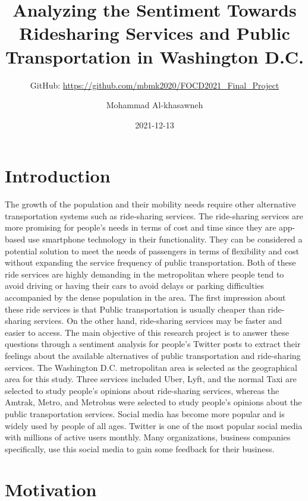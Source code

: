 \documentclass[
  12pt,
]{article}
\title{Analyzing the Sentiment Towards Ridesharing Services and Public
Transportation in Washington D.C.}
\subtitle{GitHub: \url{https://github.com/mbmk2020/FOCD2021_Final_Project}}
\author{Mohammad Al-khasawneh}
\date{2021-12-13}
\begin{document}
\maketitle

{
\hypersetup{linkcolor=}
\setcounter{tocdepth}{2}
\tableofcontents
}
\newpage

\hypertarget{introduction}{%
\section{Introduction}\label{introduction}}

The growth of the population and their mobility needs require other
alternative transportation systems such as ride-sharing services. The
ride-sharing services are more promising for people's needs in terms of
cost and time since they are app-based use smartphone technology in
their functionality. They can be considered a potential solution to meet
the needs of passengers in terms of flexibility and cost without
expanding the service frequency of public transportation. Both of these
ride services are highly demanding in the metropolitan where people tend
to avoid driving or having their cars to avoid delays or parking
difficulties accompanied by the dense population in the area. The first
impression about these ride services is that Public transportation is
usually cheaper than ride-sharing services. On the other hand,
ride-sharing services may be faster and easier to access. The main
objective of this research project is to answer these questions through
a sentiment analysis for people's Twitter posts to extract their
feelings about the available alternatives of public transportation and
ride-sharing services. The Washington D.C. metropolitan area is selected
as the geographical area for this study. Three services included Uber,
Lyft, and the normal Taxi are selected to study people's opinions about
ride-sharing services, whereas the Amtrak, Metro, and Metrobus were
selected to study people's opinions about the public transportation
services. Social media has become more popular and is widely used by
people of all ages. Twitter is one of the most popular social media with
millions of active users monthly. Many organizations, business companies
specifically, use this social media to gain some feedback for their
business.

\hypertarget{motivation}{%
\section{Motivation}\label{motivation}}
\end{document}

